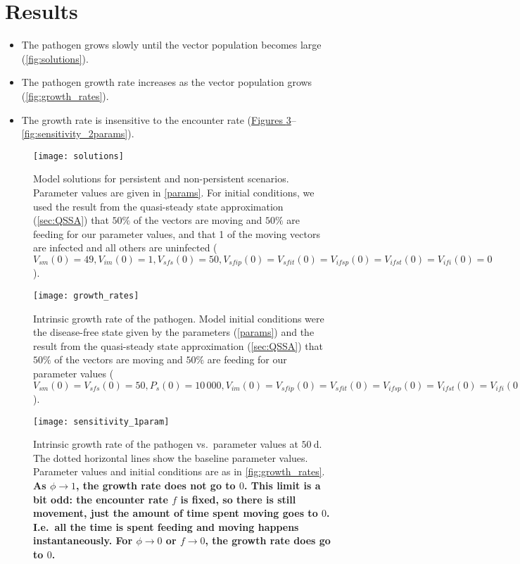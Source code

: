 \documentclass{article}
\newcommand{\comment}[1]{\textbf{#1}}
\begin{document}
\section{Results}

\begin{itemize}
\item The pathogen grows slowly until the vector population becomes
  large (\autoref{fig:solutions}).

\item The pathogen growth rate increases as the vector population
  grows (\autoref{fig:growth_rates}).

\item The growth rate is insensitive to the encounter rate
  (\hyperref[fig:sensitivity_1param]{Figures
    \ref*{fig:sensitivity_1param}}--\ref{fig:sensitivity_2params}).
\end{itemize}


\begin{figure}
  \centering
  \texttt{[image: solutions]}
  \caption{Model solutions for persistent and non-persistent
    scenarios.  Parameter values are given in \autoref{params}.
    For initial conditions, we used the result from the quasi-steady
    state approximation (\autoref{sec:QSSA}) that $50\%$ of the
    vectors are moving and $50\%$ are feeding for our parameter
    values, and that 1 of the moving vectors are infected and all
    others are uninfected ($V_{sm}(0) = 49, V_{im}(0) = 1, V_{sfs}(0) =
    50, V_{sfip}(0) = V_{sfit}(0) = V_{ifsp}(0) = V_{ifst}(0) =
    V_{ifi}(0) = 0$).}
  \label{fig:solutions}
\end{figure}

\begin{figure}
  \centering
  \texttt{[image: growth\_rates]}
  \caption{Intrinsic growth rate of the pathogen.  Model initial
    conditions were the disease-free state given by the parameters
    (\autoref{params}) and the result from the quasi-steady state
    approximation (\autoref{sec:QSSA}) that $50\%$ of the vectors are
    moving and $50\%$ are feeding for our parameter values ($V_{sm}(0)
    = V_{sfs}(0) = 50, P_s(0) = 10\,000, V_{im}(0) = V_{sfip}(0) =
    V_{sfit}(0) = V_{ifsp}(0) = V_{ifst}(0) = V_{ifi}(0) = P_i(0) =
    0$).}
  \label{fig:growth_rates}
\end{figure}

\begin{figure}
  \centering
  \texttt{[image: sensitivity\_1param]}
  \caption{Intrinsic growth rate of the pathogen vs.~parameter values
    at $50~\text{d}$.  The dotted horizontal lines show the baseline
    parameter values.  Parameter values and initial conditions are as
    in \autoref{fig:growth_rates}.
    \comment{As $\phi \to 1$, the
      growth rate does not go to $0$.  This limit is a bit odd: the
      encounter rate $f$ is fixed, so there is still movement, just
      the amount of time spent moving goes to $0$.  I.e.~all the time
      is spent feeding and moving happens instantaneously.  For
      $\phi \to 0$ or $f \to 0$, the growth rate does go to $0$.}}
  \label{fig:sensitivity_1param}
\end{figure}
\end{document}

